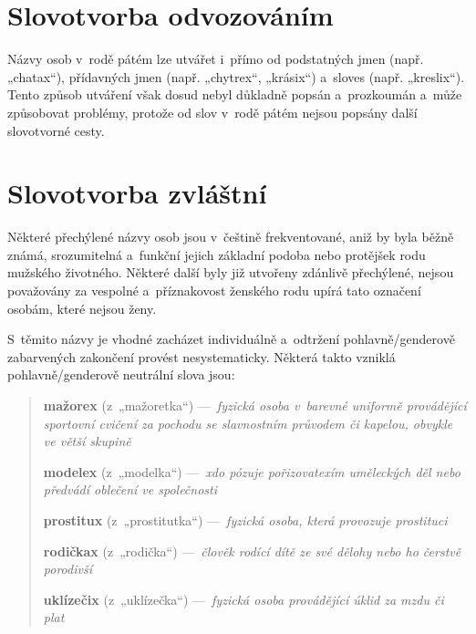 \section{Slovotvorba odvozováním}

Názvy osob v rodě pátém lze utvářet i přímo od podstatných jmen
(např. „chatax“), přídavných jmen (např. „chytrex“, „krásix“)
a sloves (např. „kreslix“). Tento způsob utváření
však dosud nebyl důkladně popsán a prozkoumán a může způsobovat problémy,
protože od slov v rodě pátém nejsou popsány další slovotvorné cesty.

\section{Slovotvorba zvláštní}

Některé přechýlené názvy osob jsou v češtině frekventované,
aniž by byla běžně známá, srozumitelná a funkční jejich základní podoba
nebo protějšek rodu mužského životného. Některé další byly již utvořeny
zdánlivě přechýlené, nejsou považovány za vespolné a příznakovost ženského rodu
upírá tato označení osobám, které nejsou ženy.

S těmito názvy je vhodné zacházet individuálně a odtržení
pohlavně/genderově zabarvených zakončení provést nesystematicky.
Některá takto vzniklá pohlavně/genderově neutrální slova jsou:

\newenvironment{slovnik}{%
    \newcommand*{\slovo}[3]{\noindent\textbf{##2} ({\footnotesize z~„##1“}) {---~\itshape{}##3}\par}%
    \begin{quote}
    }{%
    \par\end{quote}%
}

\begin{slovnik}%
\slovo{mažoretka}{mažorex}{fyzická osoba v barevné uniformě provádějící sportovní cvičení za pochodu se slavnostním průvodem či kapelou, obvykle ve větší skupině}%
\slovo{modelka}{modelex}{xdo pózuje pořizovatexím uměleckých děl nebo předvádí oblečení ve společnosti}%
\slovo{prostitutka}{prostitux}{fyzická osoba, která provozuje prostituci}%
\slovo{rodička}{rodičkax}{člověk rodící dítě ze své dělohy nebo ho čerstvě porodivší}%
\slovo{uklízečka}{uklízečix}{fyzická osoba provádějící úklid za mzdu či plat}%
\end{slovnik}
